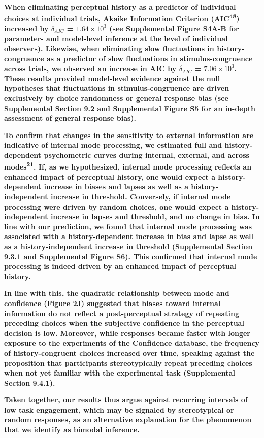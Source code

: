 \documentclass[
]{article}
\begin{document}
\textbf{When eliminating perceptual history as a predictor of individual
choices at individual trials, Akaike Information Criterion
(AIC\textsuperscript{48}) increased by \(\delta_{AIC}\) =
\(\ensuremath{1.64\times 10^{3}}\) (see Supplemental Figure S4A-B for
parameter- and model-level inference at the level of individual
observers). Likewise, when eliminating slow fluctuations in
history-congruence as a predictor of slow fluctuations in
stimulus-congruence across trials, we observed an increase in AIC by
\(\delta_{AIC}\) = \(\ensuremath{7.06\times 10^{3}}\). These results
provided model-level evidence against the null hypotheses that
fluctuations in stimulus-congruence are driven exclusively by choice
randomness or general response bias (see Supplemental Section 9.2 and
Supplemental Figure S5 for an in-depth assessment of general response
bias).}

\textbf{To confirm that changes in the sensitivity to external
information are indicative of internal mode processing, we estimated
full and history-dependent psychometric curves during internal,
external, and across modes\textsuperscript{21}. If, as we hypothesized,
internal mode processing reflects an enhanced impact of perceptual
history, one would expect a history-dependent increase in biases and
lapses as well as a history-independent increase in threshold.
Conversely, if internal mode processing were driven by random choices,
one would expect a history-independent increase in lapses and threshold,
and no change in bias. In line with our prediction, we found that
internal mode processing was associated with a history-dependent
increase in bias and lapse as well as a history-independent increase in
threshold (Supplemental Section 9.3.1 and Supplemental Figure S6). This
confirmed that internal mode processing is indeed driven by an enhanced
impact of perceptual history.}

\textbf{In line with this, the quadratic relationship between mode and
confidence (Figure 2J) suggested that biases toward internal information
do not reflect a post-perceptual strategy of repeating preceding choices
when the subjective confidence in the perceptual decision is low.
Moreover, while responses became faster with longer exposure to the
experiments of the Confidence database, the frequency of
history-congruent choices increased over time, speaking against the
proposition that participants stereotypically repeat preceding choices
when not yet familiar with the experimental task (Supplemental Section
9.4.1).}

\textbf{Taken together, our results thus argue against recurring
intervals of low task engagement, which may be signaled by stereotypical
or random responses, as an alternative explanation for the phenomenon
that we identify as bimodal inference.}
\end{document}
